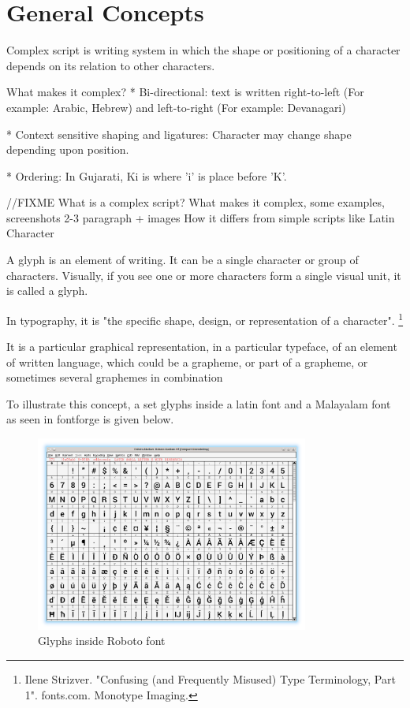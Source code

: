 \chapter{General Concepts}


Complex script is writing system in which the shape or positioning of a character
depends on its relation to other characters.

What makes it complex?
* Bi-directional: text is written right-to-left (For example: Arabic, Hebrew)
and left-to-right (For example: Devanagari)

* Context sensitive shaping and ligatures: Character may change shape depending
upon position.

* Ordering:
In Gujarati, Ki is where 'i' is place before 'K'.

//FIXME
What is a complex script? What makes it complex, some examples, screenshots
2-3 paragraph + images
How it differs from simple scripts like Latin Character


A glyph is an element of writing. It can be a single character or group of characters. 
Visually, if you see one or more characters form a single visual unit, it is called a glyph.

In typography, it is "the specific shape, design, or representation of a character".
\footnote{Ilene Strizver. "Confusing (and Frequently Misused) Type Terminology, Part 1". fonts.com. Monotype Imaging.}

It is a particular graphical representation, in a particular typeface, of an element of written language, which could be a grapheme, or part of a grapheme, or sometimes several graphemes in combination 
 
To illustrate this concept, a set glyphs inside a latin font and a Malayalam font as seen in fontforge is given below.

\begin{figure}[h]
    \centering
    \includegraphics[width=0.8\textwidth]{glyph-fontforge-roboto.png}
    \caption{Glyphs inside Roboto font}
\end{figure}


